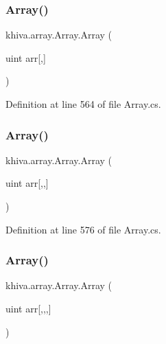\subsubsection{\texorpdfstring{Array()}{Array()}\hspace{0.1cm}{\footnotesize\ttfamily [22/46]}}
{\footnotesize\ttfamily khiva.\+array.\+Array.\+Array (\begin{DoxyParamCaption}\item[{uint}]{arr\mbox{[},\mbox{]} }\end{DoxyParamCaption})\hspace{0.3cm}{\ttfamily [inline]}}



Definition at line 564 of file Array.\+cs.

\mbox{\label{classkhiva_1_1array_1_1_array_ab246356d3744ef097b306659a6c8d7bc}} 
\subsubsection{\texorpdfstring{Array()}{Array()}\hspace{0.1cm}{\footnotesize\ttfamily [23/46]}}
{\footnotesize\ttfamily khiva.\+array.\+Array.\+Array (\begin{DoxyParamCaption}\item[{uint}]{arr\mbox{[},,\mbox{]} }\end{DoxyParamCaption})\hspace{0.3cm}{\ttfamily [inline]}}



Definition at line 576 of file Array.\+cs.

\mbox{\label{classkhiva_1_1array_1_1_array_acf888557283df92964226cb03d32f1fe}} 
\subsubsection{\texorpdfstring{Array()}{Array()}\hspace{0.1cm}{\footnotesize\ttfamily [24/46]}}
{\footnotesize\ttfamily khiva.\+array.\+Array.\+Array (\begin{DoxyParamCaption}\item[{uint}]{arr\mbox{[},,,\mbox{]} }\end{DoxyParamCaption})\hspace{0.3cm}{\ttfamily [inline]}}



